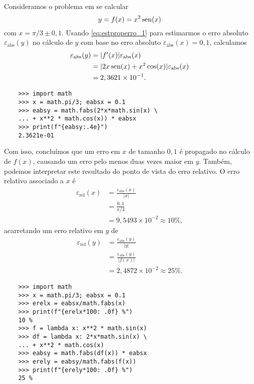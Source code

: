 \begin{ex}\label{ex:properro_1}
  Consideramos o problema em se calcular
  \begin{equation}
    y = f(x) = x^2\operatorname{sen}(x)
  \end{equation}
  com $x=\pi/3 \pm 0,1$. Usando \eqref{eq:estproperro_1} para estimarmos o erro absoluto $\varepsilon_{\text{abs}}(y)$ no cálculo de $y$ com base no erro absoluto $\varepsilon_{\text{abs}}(x)=0,1$, calculamos
  \begin{align}
    \varepsilon_{\text{abs}}(y) &= |f'(x)|\varepsilon_{\text{abs}}(x)\\
             &= |2x\operatorname{sen}(x) + x^2\cos(x)|\varepsilon_{\text{abs}}(x)\\
             &= 2,3621\times 10^{-1}.
  \end{align}

  
  \begin{lstlisting}
    >>> import math
    >>> x = math.pi/3; eabsx = 0.1
    >>> eabsy = math.fabs(2*x*math.sin(x) \
    ... + x**2 * math.cos(x)) * eabsx
    >>> print(f"{eabsy:.4e}")
    2.3621e-01
\end{lstlisting}
  
  
  Com isso, concluímos que um erro em $x$ de tamanho $0,1$ é propagado no cálculo de $f(x)$, causando um erro pelo menos duas vezes maior em $y$. Também, podemos interpretar este resultado do ponto de vista do erro relativo. O erro relativo associado a $x$ é
  \begin{align}
    \varepsilon_{\text{rel}}(x) &= \frac{\varepsilon_{\text{abs}}(x)}{|x|}\\
                                &= \frac{0,1}{\pi/3}\\
                                &= 9,5493\times 10^{-2} \approx 10\%,
  \end{align}
  acarretando um erro relativo em $y$ de
  \begin{align}
    \varepsilon_{\text{rel}}(y) &= \frac{\varepsilon_{\text{abs}}(y)}{|y|}\\
                                &= \frac{\varepsilon_{\text{abs}}(y)}{|f(x)|} \\
                                &= 2,4872\times 10^{-2} \approx 25\%.
  \end{align}

  
  \begin{lstlisting}
    >>> import math
    >>> x = math.pi/3; eabsx = 0.1
    >>> erelx = eabsx/math.fabs(x)
    >>> print(f"{erelx*100: .0f} %")
    10 %
    >>> f = lambda x: x**2 * math.sin(x) 
    >>> df = lambda x: 2*x*math.sin(x) \
    ... + x**2 * math.cos(x)
    >>> eabsy = math.fabs(df(x)) * eabsx
    >>> erely = eabsy/math.fabs(f(x))
    >>> print(f"{erely*100: .0f} %")
    25 %
  \end{lstlisting}
  
\end{ex}


